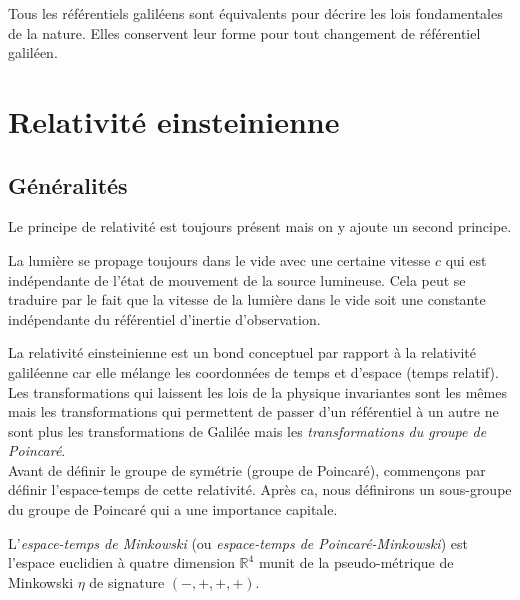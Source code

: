 \documentclass[a4paper,11pt]{report}
\begin{document}
        \begin{prin}[de relativité]
        \begin{leftbar}
            Tous les référentiels galiléens sont équivalents pour décrire les lois fondamentales de la nature. Elles conservent leur forme pour tout changement de référentiel galiléen.
        \end{leftbar}
        \end{prin}
    
    \section{Relativité einsteinienne}
    
        \subsection{Généralités}
    
            Le principe de relativité est toujours présent mais on y ajoute un second principe.
            
            \begin{prin}
            \begin{leftbar}
                La lumière se propage toujours dans le vide avec une certaine vitesse $c$ qui est indépendante de l'état de mouvement de la source lumineuse. Cela peut se traduire par le fait que la vitesse de la lumière dans le vide soit une constante indépendante du référentiel d'inertie d'observation.
            \end{leftbar}
            \end{prin}
            
            La relativité einsteinienne est un bond conceptuel par rapport à la relativité galiléenne car elle mélange les coordonnées de temps et d'espace (temps relatif). Les transformations qui laissent les lois de la physique invariantes sont les mêmes mais les transformations qui permettent de passer d'un référentiel à un autre ne sont plus les transformations de Galilée mais les \textit{transformations du groupe de Poincaré}.\\
            
            Avant de définir le groupe de symétrie (groupe de Poincaré), commençons par définir l'espace-temps de cette relativité. Après ca, nous définirons un sous-groupe du groupe de Poincaré qui a une importance capitale.
            
            \begin{defn}
                L'\textit{espace-temps de Minkowski} (ou \textit{espace-temps de Poincaré-Minkowski}) est l'espace euclidien à quatre dimension $\mathbb{R}^4$ munit de la pseudo-métrique de Minkowski $\eta$ de signature $(-,+,+,+)$.
            \end{defn}
            
\end{document}
